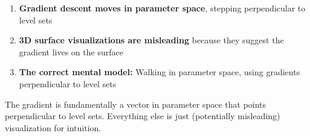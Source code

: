 \begin{notechapter}
\begin{enumerate}
    \item \textbf{Gradient descent moves in parameter space}, stepping
    perpendicular to level sets
    
    \item \textbf{3D surface visualizations are misleading} because they suggest
    the gradient lives on the surface
    
    \item \textbf{The correct mental model:} Walking in parameter space,
    using gradients perpendicular to level sets

\end{enumerate}

The gradient is fundamentally a vector in parameter space that points perpendicular
to level sets. Everything else is just (potentially misleading) visualization for intuition.
\end{notechapter}
